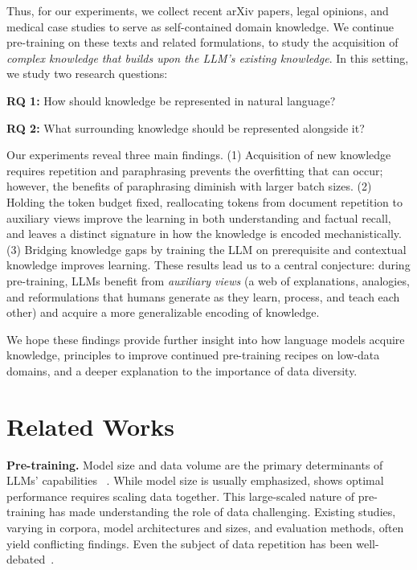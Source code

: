 \documentclass[11pt]{article}
\begin{document}
Thus, for our experiments, we collect recent arXiv papers, legal opinions, and medical case studies to serve as self-contained domain knowledge. We continue pre-training on these texts and related formulations, to study the acquisition of \textit{complex knowledge that builds upon the LLM's existing knowledge}. In this setting, we study two research questions:

\textbf{RQ 1:} How should knowledge be represented in natural language?

\textbf{RQ 2:} What surrounding knowledge should be represented alongside it?


Our experiments reveal three main findings. (1) Acquisition of new knowledge requires repetition and paraphrasing prevents the overfitting that can occur; however, the benefits of paraphrasing diminish with larger batch sizes. (2) Holding the token budget fixed, reallocating tokens from document repetition to auxiliary views improve the learning in both understanding and factual recall, and leaves a distinct signature in how the knowledge is encoded mechanistically. (3) Bridging knowledge gaps by training the LLM on prerequisite and contextual knowledge improves learning. These results lead us to a central conjecture: during pre-training, LLMs benefit from \textit{auxiliary views} (a web of explanations, analogies, and reformulations that humans generate as they learn, process, and teach each other) and acquire a more generalizable encoding of knowledge.


We hope these findings  provide further insight into how language models acquire knowledge, principles to improve continued pre-training recipes on low-data domains, and a deeper explanation to the importance of data diversity.


\section{Related Works}
\label{related_works}


\textbf{Pre-training.} Model size and data volume are the primary determinants of LLMs' capabilities ~\citep{brown2020language, kaplan2020scaling, carlini2022quantifying, tirumala2022memorization}. While model size is usually emphasized, \citet{hoffmann2022training} shows optimal performance requires scaling data together. This large-scaled nature of pre-training has made understanding the role of data challenging. Existing studies, varying in corpora, model architectures and sizes, and evaluation methods, often yield conflicting findings. Even the subject of data repetition has been well-debated~\citep{lee2021deduplicating, taylor2022galactica, hernandez2022scaling, xue2023repeat, muennighoff2023scaling}.  
\end{document}
